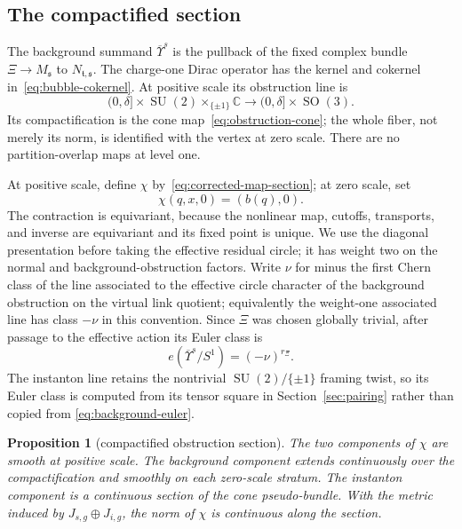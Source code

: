 \documentclass[11pt]{amsart}
\newtheorem{proposition}[theorem]{Proposition}
\theoremstyle{definition}
\theoremstyle{remark}
\theoremstyle{plain}
\newcommand{\CC}{\mathbb{C}}
\newcommand{\SO}{\operatorname{SO}}
\newcommand{\SU}{\operatorname{SU}}
\begin{document}
\subsection{The compactified section}
The background summand $\overline\Upsilon^s$ is the pullback of the fixed
complex bundle $\Xi\to M_{\mathfrak s}$ to
$N_{\mathfrak t,\mathfrak s}$.  The charge-one Dirac
operator has the kernel and cokernel in~\eqref{eq:bubble-cokernel}.
At positive scale its obstruction line is
\[
 (0,\delta]\times\SU(2)\times_{\{\pm1\}}\CC
 \longrightarrow(0,\delta]\times\SO(3).
\]
Its compactification is the cone map~\eqref{eq:obstruction-cone}; the whole
fiber, not merely its norm, is identified with the vertex at zero scale.
There are no partition-overlap maps at level one.

At positive scale, define $\chi$ by~\eqref{eq:corrected-map-section}; at zero
scale, set
\begin{equation}\label{eq:zero-scale-obstruction}
 \chi(q,x,0)=(b(q),0).
\end{equation}
The contraction is equivariant, because the nonlinear map, cutoffs,
transports, and inverse are equivariant and its fixed point is unique.  We use
the diagonal presentation before taking the effective residual circle; it has
weight two on the normal and background-obstruction factors.  Write
$\nu$ for minus the first Chern class of the line associated to the
effective circle character of the background obstruction on the virtual
link quotient; equivalently the weight-one associated line has class
$-\nu$ in this convention.  Since $\Xi$ was chosen globally trivial,
after passage to the effective action its Euler class is
\begin{equation}\label{eq:background-euler}
 e(\overline\Upsilon^s/S^1)=(-\nu)^{r_\Xi}.
\end{equation}
The instanton line retains the nontrivial
$\SU(2)/\{\pm1\}$ framing twist, so its Euler class is computed from its
tensor square in Section~\ref{sec:pairing} rather than copied from
\eqref{eq:background-euler}.

\begin{proposition}[compactified obstruction section]
\label{prop:obstruction-section}
The two components of $\chi$ are smooth at positive scale.  The background
component extends continuously over the compactification and smoothly on
each zero-scale stratum.  The instanton component is a continuous section of
the cone pseudo-bundle.  With the metric induced by
$J_{s,g}\oplus J_{i,g}$, the norm of $\chi$ is continuous along the section.
\end{proposition}
\end{document}
